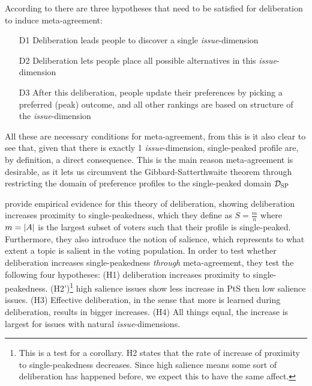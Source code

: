 According to \citet{listTwoConceptsAgreement2002} there are three hypotheses that need to be satisfied for deliberation to induce meta-agreement:
\begin{enumerate}
	\label{list:meta-agreement-checklist}
	\setlength\itemsep{1px}
	\item [D1] Deliberation leads people to discover a single \textit{issue}-dimension
	\item [D2] Deliberation lets people place all possible alternatives in this \textit{issue}-dimension
	\item [D3] After this deliberation, people update their preferences by picking a preferred (peak) outcome, and all other rankings are based on structure of the \textit{issue}-dimension
\end{enumerate}

All these are necessary conditions for meta-agreement, from this is it also clear to see that, given that there is exactly 1 \textit{issue}-dimension, single-peaked profile are, by definition, a direct consequence. This is the main reason meta-agreement is desirable, as it lets us circumvent the Gibbard-Satterthwaite theorem \citep{gibbardManipulationVotingSchemes1973, satterthwaiteStrategyproofnessArrowsConditions1975} through restricting the domain of preference profiles to the single-peaked domain $\mathcal{D}_{\textnormal{SP}}$


\citet{listDeliberationSinglePeakednessPossibility2013} provide empirical evidence for this theory of deliberation, showing deliberation increases proximity to single-peakedness, which they define as $S= \frac{m}{n}$ where $m = |A|$ is the largest subset of voters such that their profile is single-peaked. Furthermore, they also introduce the notion of salience, which represents to what extent a topic is salient in the voting population. In order to test whether deliberation increases single-peakedness \textit{through} meta-agreement, they test the following four hypotheses: (H1) deliberation increases proximity to single-peakedness. (H2')\footnote{This is a test for a corollary. H2 states that the rate of increase of proximity to single-peakedness decreases. Since high salience means some sort of deliberation has happened before, we expect this to have the same affect.} high salience issues show less increase in PtS then low salience issues. (H3) Effective deliberation, in the sense that more is learned during deliberation, results in bigger increases. (H4) All things equal, the increase is largest for issues with natural \textit{issue}-dimensions.

